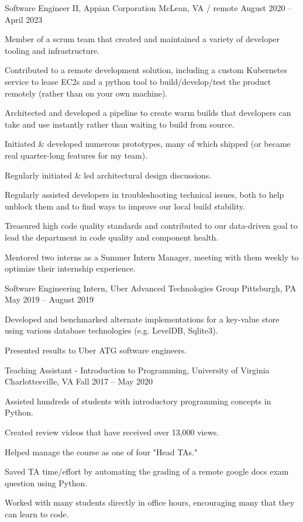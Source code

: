\documentclass[letterpaper,10pt]{article}
\begin{document}
\begin{job}
{Software Engineer II, Appian Corporation}
{McLean, VA / remote}
{August 2020 -- April 2023}
    \item Member of a scrum team that created and maintained a variety of developer tooling and infrastructure.
    \item Contributed to a remote development solution, including a custom Kubernetes service to lease EC2s and a python tool to build/develop/test the product remotely (rather than on your own machine).
    \item Architected and developed a pipeline to create warm builds that developers can take and use instantly rather than waiting to build from source.
    \item Initiated \& developed numerous prototypes, many of which shipped (or became real quarter-long features for my team).
    \item Regularly initiated \& led architectural design discussions.
    \item Regularly assisted developers in troubleshooting technical issues, both to help unblock them and to find ways to improve our local build stability.
    \item Treasured high code quality standards and contributed to our data-driven goal to lead the department in code quality and component health.
    \item Mentored two interns as a Summer Intern Manager, meeting with them weekly to optimize their internship experience.
\end{job}

\begin{job}
{Software Engineering Intern, Uber Advanced Technologies Group}
{Pittsburgh, PA}
{May 2019 -- August 2019}
    \item Developed and benchmarked alternate implementations for a key-value store using various database technologies (e.g. LevelDB, Sqlite3).
    \item Presented results to Uber ATG software engineers.
\end{job}

\begin{job}
{Teaching Assistant - Introduction to Programming, University of Virginia}
{Charlottesville, VA}
{Fall 2017 -- May 2020}
    \item Assisted hundreds of students with introductory programming concepts in Python.
    \item Created review videos that have received over 13,000 views.
    \item Helped manage the course as one of four "Head TAs."
    \item Saved TA time/effort by automating the grading of a remote google docs exam question using Python.
    \item Worked with many students directly in office hours, encouraging many that they can learn to code.
\end{job}
\end{document}
